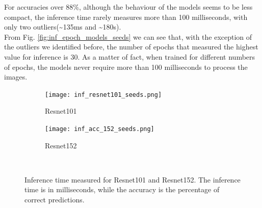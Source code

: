 For accuracies over 88\%, although the behaviour of the models seems to be less compact, the inference time rarely measures more than 100 milliseconds, with only two outliers(\textasciitilde135ms and \textasciitilde180s).\\
From Fig. \ref{fig:inf_epoch_models_seeds} we can see that, with the exception of the outliers we identified before, the number of epochs that measured the highest value for inference is 30. As a matter of fact, when trained for different numbers of epochs, the models never require more than 100 milliseconds to process the images. 
\begin{figure}[h]
     \begin{subfigure}{0.5\textwidth}
	    \texttt{[image: inf\_resnet101\_seeds.png]}
	    \caption{Resnet101}
         \label{fig:inf_resnet101_seeds}
     \end{subfigure}
     \hfill
     \begin{subfigure}{0.5\textwidth}
	    \texttt{[image: inf\_acc\_152\_seeds.png]}
	    \caption{Resnet152}
        \label{fig:inf_acc_152_seeds}
     \end{subfigure}\\
     \caption[Inference time measured for Resnet101 and Resnet152]{Inference time measured for Resnet101 and Resnet152. The inference time is in milliseconds, while the accuracy is the percentage of correct predictions.}
        \label{fig:inf_time_epoch_seeds2}
\end{figure}



